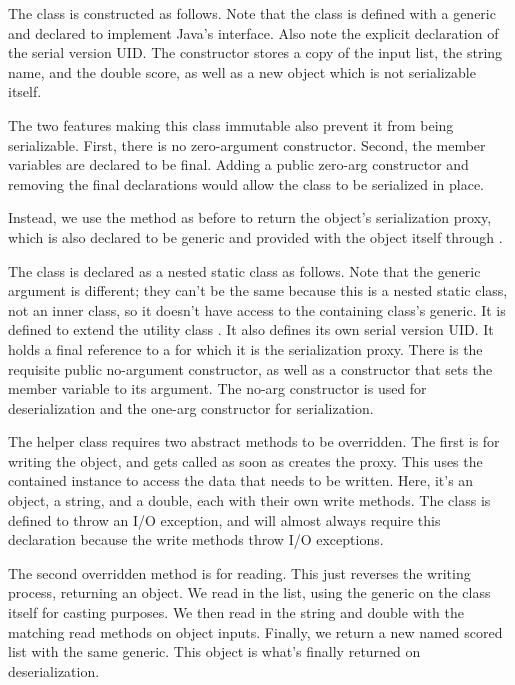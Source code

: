 The class is constructed as follows.
%
%
Note that the class is defined with a generic and declared to
implement Java's  interface.  Also note the
explicit declaration of the serial version UID.  The constructor
stores a copy of the input list, the string name, and the double
score, as well as a new object which is not serializable itself.

The two features making this class immutable also prevent it from
being serializable.  First, there is no zero-argument constructor.
Second, the member variables are declared to be final.  Adding a
public zero-arg constructor and removing the final declarations would
allow the class to be serialized in place.

Instead, we use the  method as before to
return the object's serialization proxy, which is also declared
to be generic and provided with the object itself through .
%

The class  is declared as a nested static class
as follows.
%
%
Note that the generic argument is different; they can't be the same
because this is a nested static class, not an inner class, so it
doesn't have access to the containing class's generic.  It is defined
to extend the utility class .  It also
defines its own serial version UID.  It holds a final reference to a
 for which it is the serialization proxy.  There
is the requisite public no-argument constructor, as well as a
constructor that sets the member variable to its argument.  The no-arg
constructor is used for deserialization and the one-arg constructor
for serialization.

The helper class requires two abstract methods to be overridden.
The first is for writing the object, and gets called as soon as
 creates the proxy.
%
%
This uses the contained instance  to access the data that
needs to be written.  Here, it's an object, a string, and a double,
each with their own write methods.  The class is defined to throw
an I/O exception, and will almost always require this declaration
because the write methods throw I/O exceptions.

The second overridden method is for reading.  This just reverses
the writing process, returning an object.
%
%
We read in the list, using the generic on the class itself
for casting purposes.  We then read in the string and double
with the matching read methods on object inputs.  Finally, we
return a new named scored list with the same generic.  This
object is what's finally returned on deserialization.

